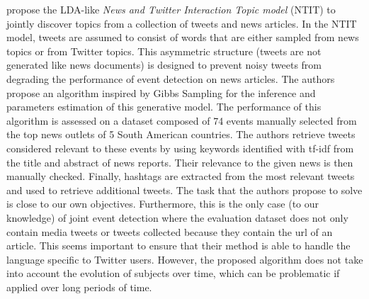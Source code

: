 \cite{hua_topical_2016} propose the LDA-like \textit{News
and Twitter Interaction Topic model} (NTIT) to jointly discover topics from a collection of tweets and news articles. In the NTIT model, tweets are assumed to consist of words that are either sampled from news topics or from Twitter
topics. This asymmetric structure (tweets are not generated like news documents) is designed to prevent noisy tweets from degrading the performance of event detection on news articles.
The authors propose an algorithm inspired by Gibbs Sampling \citep{welling_hybrid_2008} for the inference and parameters estimation of this generative model. The performance of this algorithm is assessed on a dataset composed of 74 events manually selected from the top news outlets of 5 South American countries. The authors retrieve tweets considered relevant to these events by using keywords identified with tf-idf from the title and abstract of news reports. Their relevance to the given news is then manually checked. Finally, hashtags are extracted from the most relevant tweets and used to retrieve additional tweets. The task that the authors propose to solve is close to our own objectives. Furthermore, this is the only case (to our knowledge) of joint event detection where the evaluation dataset does not only contain media tweets or tweets collected because they contain the url of an article. This seems important to ensure that their method is able to handle the language specific to Twitter users. However, the proposed algorithm does not take into account the evolution of subjects over time, which can be problematic if applied over long periods of time.

